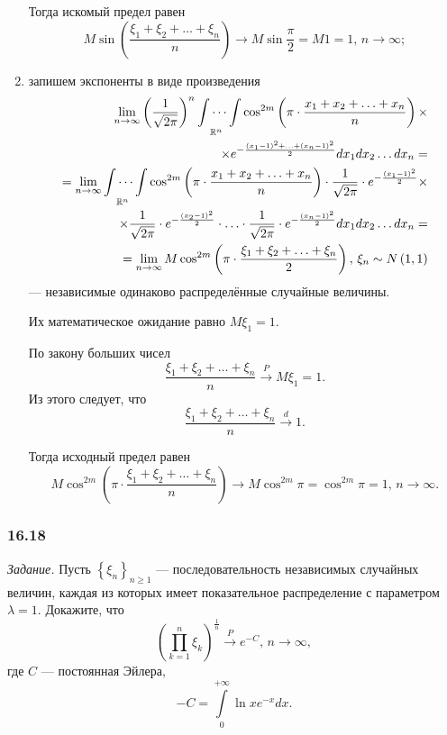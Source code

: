 \begin{enumerate}[label=\alph*)]
Тогда искомый предел равен
$$M \sin \left( \frac{ \xi_1 + \xi_2 + \dotsc + \xi_n}{n} \right) \to M \sin \frac{ \pi }{2} =
M1 = 1, \,
n \to \infty;$$
\item запишем экспоненты в виде произведения
\begin{equation*}
\begin{split}
  \lim \limits_{n \to \infty } \left( \frac{1}{ \sqrt{2 \pi }} \right)^n
  \idotsint \limits_{ \mathbb{R}^n} \cos^{2m}
  \left( \pi \cdot \frac{x_1 + x_2 + \dotsc + x_n}{n} \right) \times \\
  \times e^{- \frac{ \left( x_1 - 1 \right)^2 + \dotsc + \left( x_n - 1 \right)^2}{2}}
  dx_1 dx_2 \dotsc dx_n = \\
  = \lim \limits_{n \to \infty } \idotsint \limits_{ \mathbb{R}^n} \cos^{2m}
  \left( \pi \cdot \frac{x_1 + x_2 + \dotsc + x_n}{n} \right) \cdot \frac{1}{ \sqrt{2 \pi }} \cdot
  e^{- \frac{ \left( x_1 - 1 \right)^2}{2}} \times \\
  \times \frac{1}{ \sqrt{2 \pi }} \cdot e^{- \frac{ \left( x_2 - 1 \right)^2}{2}} \cdot \dotsc \cdot
  \frac{1}{ \sqrt{2 \pi }} \cdot
  e^{- \frac{ \left( x_n - 1 \right)^2}{2}} dx_1 dx_2 \dotsc dx_n = \\
  = \lim \limits_{n \to \infty } M \cos^{2m}
  \left( \pi \cdot \frac{ \xi_1 + \xi_2 + \dotsc + \xi_n}{2} \right), \,
  \xi_n \sim N \left( 1, 1 \right)
\end{split}
\end{equation*}
--- независимые одинаково распределённые случайные величины.

Их математическое ожидание равно $M \xi_1 = 1$.

По закону больших чисел
$$ \frac{ \xi_1 + \xi_2 + \dotsc + \xi_n}{n} \overset{P}{ \rightarrow } M \xi_1 = 1.$$
Из этого следует, что
$$ \frac{ \xi_1 + \xi_2 + \dotsc + \xi_n}{n} \overset{d}{ \rightarrow } 1.$$

Тогда исходный предел равен
$$M \cos^{2m} \left( \pi \cdot \frac{ \xi_1 + \xi_2 + \dotsc + \xi_n}{n} \right) \to
  M \cos^{2m} \pi =
  \cos^{2m} \pi = 1, \,
  n \to \infty.$$
\end{enumerate}

\subsubsection*{16.18}

\textit{Задание.}
Пусть $ \left\{ \xi_n \right\}_{n \geq 1}$ --- последовательность независимых случайных величин,
каждая из которых имеет показательное распределение с параметром $ \lambda = 1$.
Докажите, что
$$ \left( \prod \limits_{k = 1}^n \xi_k \right)^{ \frac{1}{n}} \overset{P}{ \rightarrow } e^{-C}, \,
  n \to \infty,$$
где $C$ --- постоянная Эйлера,
$$-C =
  \int \limits_0^{+ \infty } \ln x e^{-x} dx.$$

